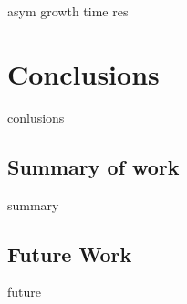 asym growth time res


\section{Conclusions}%
\label{sec:Res1_Conclusions}

conlusions

\subsection{Summary of work}%
\label{sec:Res1_Summary}

summary

\subsection{Future Work}%
\label{sec:Res1_future}

future